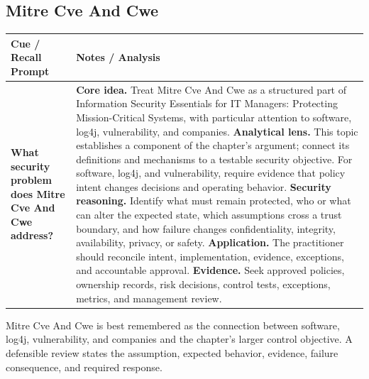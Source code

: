 \documentclass[11pt]{article}
\newcommand{\CornellHeader}{%
\rowcolor{Navy}\color{white}\bfseries Cue / Recall Prompt & \color{white}\bfseries Notes / Analysis\\\hline}
\newcommand{\CornellRow}[2]{%
\cellcolor{CueGray}\RaggedRight\textbf{#1} & \RaggedRight #2\\\hline}
\begin{document}
\subsection*{Mitre Cve And Cwe}
\begin{longtable}{>{\RaggedRight\arraybackslash}p{}|>{\RaggedRight\arraybackslash}p{}}
\CornellHeader
\CornellRow{What security problem does Mitre Cve And Cwe address?}{\textbf{Core idea.} Treat Mitre Cve And Cwe as a structured part of Information Security Essentials for IT Managers: Protecting Mission-Critical Systems, with particular attention to software, log4j, vulnerability, and companies. \textbf{Analytical lens.} This topic establishes a component of the chapter's argument; connect its definitions and mechanisms to a testable security objective. For software, log4j, and vulnerability, require evidence that policy intent changes decisions and operating behavior. \textbf{Security reasoning.} Identify what must remain protected, who or what can alter the expected state, which assumptions cross a trust boundary, and how failure changes confidentiality, integrity, availability, privacy, or safety. \textbf{Application.} The practitioner should reconcile intent, implementation, evidence, exceptions, and accountable approval. \textbf{Evidence.} Seek approved policies, ownership records, risk decisions, control tests, exceptions, metrics, and management review.}
\end{longtable}
\begin{topicsummary}
Mitre Cve And Cwe is best remembered as the connection between software, log4j, vulnerability, and companies and the chapter's larger control objective. A defensible review states the assumption, expected behavior, evidence, failure consequence, and required response.
\end{topicsummary}
\end{document}
